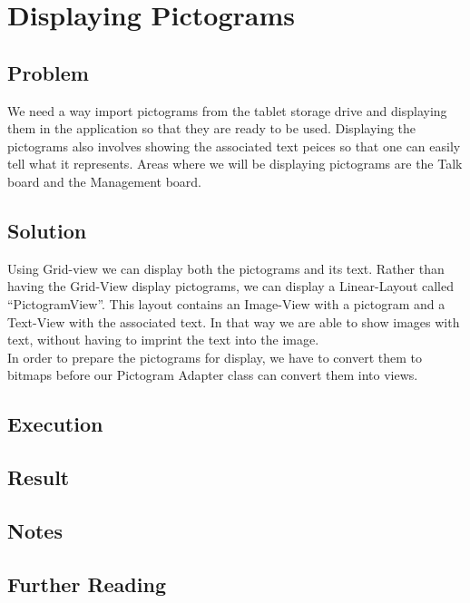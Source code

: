 \section{Displaying Pictograms} %

\subsection{Problem}
We need a way import pictograms from the tablet storage drive and displaying them in the application so that they are ready to be used.
Displaying the pictograms also involves showing the associated text peices so that one can easily tell what it represents.
Areas where we will be displaying pictograms are the Talk board and the Management board.

\subsection{Solution}
Using Grid-view we can display both the pictograms and its text.
Rather than having the Grid-View display pictograms, we can display a Linear-Layout called ``PictogramView''.
This layout contains an Image-View with a pictogram and a Text-View with the associated text.
In that way we are able to show images with text, without having to imprint the text into the image.\\

In order to prepare the pictograms for display, we have to convert them to bitmaps before our Pictogram Adapter class can convert them into views.

\subsection{Execution}

\subsection{Result}

\subsection{Notes}

\subsection{Further Reading}
